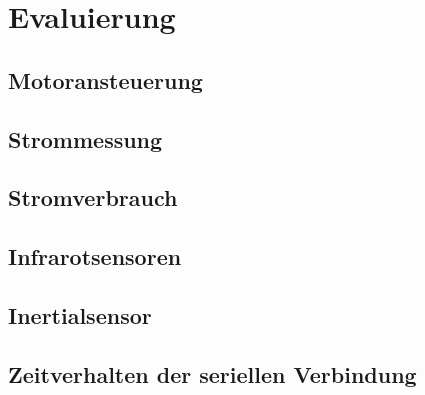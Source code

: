 \chapter{Evaluierung}

\section{Motoransteuerung}

\section{Strommessung}

\section{Stromverbrauch}

\section{Infrarotsensoren}

\section{Inertialsensor}

\section{Zeitverhalten der seriellen Verbindung}